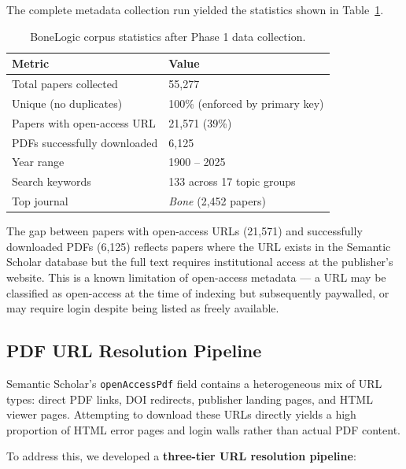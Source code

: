 \documentclass[12pt, a4paper]{article}
\begin{document}
The complete metadata collection run yielded the statistics shown in
Table~\ref{tab:corpus}.

\begin{table}[h]
\centering
\caption{BoneLogic corpus statistics after Phase 1 data collection.}
\label{tab:corpus}
\begin{tabular}{ll}
\toprule
\textbf{Metric} & \textbf{Value} \\
\midrule
Total papers collected         & 55,277 \\
Unique (no duplicates)         & 100\% (enforced by primary key) \\
Papers with open-access URL    & 21,571 (39\%) \\
PDFs successfully downloaded   & 6,125 \\
Year range                     & 1900 -- 2025 \\
Search keywords                & 133 across 17 topic groups \\
Top journal                    & \textit{Bone} (2,452 papers) \\
\bottomrule
\end{tabular}
\end{table}

The gap between papers with open-access URLs (21,571) and successfully downloaded
PDFs (6,125) reflects papers where the URL exists in the Semantic Scholar database
but the full text requires institutional access at the publisher's website.
This is a known limitation of open-access metadata --- a URL may be classified
as open-access at the time of indexing but subsequently paywalled,
or may require login despite being listed as freely available.

\subsection{PDF URL Resolution Pipeline}

Semantic Scholar's \texttt{openAccessPdf} field contains a heterogeneous mix of
URL types: direct PDF links, DOI redirects, publisher landing pages, and HTML
viewer pages. Attempting to download these URLs directly yields a high proportion
of HTML error pages and login walls rather than actual PDF content.

To address this, we developed a \textbf{three-tier URL resolution pipeline}:
\end{document}
